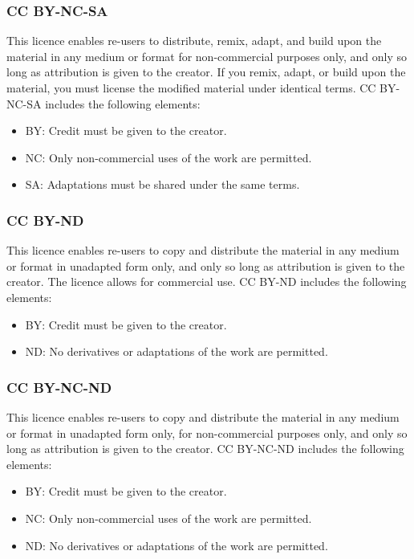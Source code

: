 \documentclass[11pt]{article}
\begin{document}
\subsubsection{CC BY-NC-SA}
\label{sec:org470945c}
This licence enables re-users to distribute, remix, adapt, and build upon the material in any medium or format for non-commercial purposes only, and only so long as attribution is given to the creator. If you remix, adapt, or build upon the material, you must license the modified material under identical terms. CC BY-NC-SA includes the following elements:
\begin{itemize}
\item BY: Credit must be given to the creator.
\item NC: Only non-commercial uses of the work are permitted.
\item SA: Adaptations must be shared under the same terms.
\end{itemize}
\subsubsection{CC BY-ND}
\label{sec:org602470a}
This licence enables re-users to copy and distribute the material in any medium or format in unadapted form only, and only so long as attribution is given to the creator. The licence allows for commercial use. CC BY-ND includes the following elements:
\begin{itemize}
\item BY: Credit must be given to the creator.
\item ND: No derivatives or adaptations of the work are permitted.
\end{itemize}

\clearpage
\subsubsection{CC BY-NC-ND}
\label{sec:org989c1ed}
This licence enables re-users to copy and distribute the material in any medium or format in unadapted form only, for non-commercial purposes only, and only so long as attribution is given to the creator. CC BY-NC-ND includes the following elements:
\begin{itemize}
\item BY: Credit must be given to the creator.
\item NC: Only non-commercial uses of the work are permitted.
\item ND: No derivatives or adaptations of the work are permitted.
\end{itemize}
\end{document}
